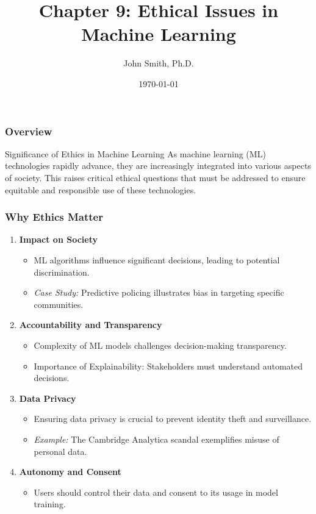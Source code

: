 \documentclass[aspectratio=169]{beamer}
\title[Ethical Issues in Machine Learning]{Chapter 9: Ethical Issues in Machine Learning}
\author[J. Smith]{John Smith, Ph.D.}
\institute[University Name]{
  Department of Computer Science\\
  University Name\\
  \vspace{0.3cm}
  Email: email@university.edu\\
  Website: www.university.edu
}
\date{\today}
\begin{document}
\frame{\titlepage}

\begin{frame}[fragile]
    \titlepage
\end{frame}

\begin{frame}[fragile]
    \frametitle{Overview}
    \begin{block}{Significance of Ethics in Machine Learning}
        As machine learning (ML) technologies rapidly advance, they are increasingly integrated into various aspects of society. This raises critical ethical questions that must be addressed to ensure equitable and responsible use of these technologies.
    \end{block}
\end{frame}

\begin{frame}[fragile]
    \frametitle{Why Ethics Matter}
    \begin{enumerate}
        \item \textbf{Impact on Society}
        \begin{itemize}
            \item ML algorithms influence significant decisions, leading to potential discrimination.
            \item \textit{Case Study:} Predictive policing illustrates bias in targeting specific communities.
        \end{itemize}

        \item \textbf{Accountability and Transparency}
        \begin{itemize}
            \item Complexity of ML models challenges decision-making transparency.
            \item Importance of Explainability: Stakeholders must understand automated decisions.
        \end{itemize}

        \item \textbf{Data Privacy}
        \begin{itemize}
            \item Ensuring data privacy is crucial to prevent identity theft and surveillance.
            \item \textit{Example:} The Cambridge Analytica scandal exemplifies misuse of personal data.
        \end{itemize}

        \item \textbf{Autonomy and Consent}
        \begin{itemize}
            \item Users should control their data and consent to its usage in model training.
        \end{itemize}

    \end{enumerate}
\end{frame}
\end{document}
